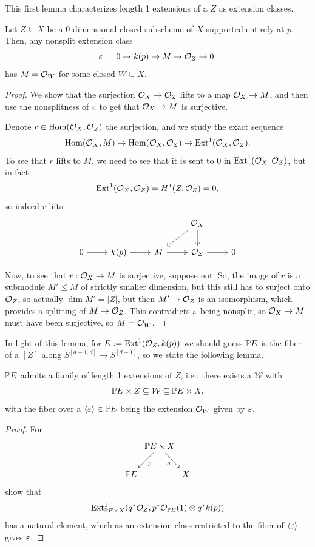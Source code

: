 \documentclass[12pt]{article}
\begin{document}
This first lemma characterizes length 1 extensions of a $Z$ as extension classes.
\begin{lem}
    Let $Z\subseteq X$ be a 0-dimensional closed subscheme of $X$ supported entirely at $p$. Then, any nonsplit extension class
    \[\eps = [0\to k(p) \to M \to \cO_Z \to 0]\]
    has $M=\cO_W$ for some closed $W\subseteq X$.
\end{lem}
\begin{proof}
    We show that the surjection $\cO_X \to \cO_Z$ lifts to a map $\cO_X \to M$, and then use the nonsplitness of $\eps$ to get that $\cO_X\to M$ is surjective.

    Denote $r \in \Hom(\cO_X,\cO_Z)$ the surjection, and we study the exact sequence
    \[\Hom(\cO_X,M) \to \Hom(\cO_X,\cO_Z) \to \Ext^1(\cO_X,\cO_Z).\]
    To see that $r$ lifts to $M$, we need to see that it is sent to 0 in $\Ext^1(\cO_X,\cO_Z)$, but in fact
    \[\Ext^1(\cO_X,\cO_Z) = H^1(Z,\cO_Z) = 0,\]
    so indeed $r$ lifts:
    \[\begin{tikzcd}
        & & & \cO_X \dar[two heads] \ar[dl,dashed] &\\
        0 \rar & k(p) \rar & M \rar[two heads] & \cO_Z \rar & 0
    \end{tikzcd}\]


    Now, to see that $r:\cO_X \to M$ is surjective, suppose not. So, the image of $r$ is a submodule $M'\leq M$ of strictly smaller dimension, but this still has to surject onto $\cO_Z$, so actually $\dim M' = |Z|$, but then $M'\to \cO_Z$ is an isomorphism, which provides a splitting of $M\to \cO_Z$. This contradicts $\eps$ being nonsplit, so $\cO_X\to M$ must have been surjective, so $M=\cO_W$.
\end{proof}

In light of this lemma, for $E\defeq \Ext^1(\cO_Z,k(p))$ we should guess $\P E$ is the fiber of a $[Z]$ along $S^{[d-1,d]} \to S^{[d-1]}$, so we state the following lemma.

\begin{lem}
    $\P E$ admits a family of length 1 extensions of $Z$, i.e., there exists a $\mathcal{W}$ with
    \[\P E \times Z \subseteq \mathcal{W} \subseteq \P E \times X,\]
    with the fiber over a $\<\eps\> \in \P E$ being the extension $\cO_W$ given by $\eps$.
\end{lem}
\begin{proof}
    For
    \[\begin{tikzcd}[column sep=0]
        & \P E \times X \ar[dl, "p"] \ar[dr, "q"'] &\\
        \P E & & X
    \end{tikzcd}\]
    show that
    \[\Ext^1_{\P E \times X}(q^*\cO_Z, p^* \cO_{\P E}(1) \otimes q^*k(p))\]
    has a natural element, which as an extension class restricted to the fiber of $\<\eps\>$ gives $\eps$.
\end{proof}
\end{document}
